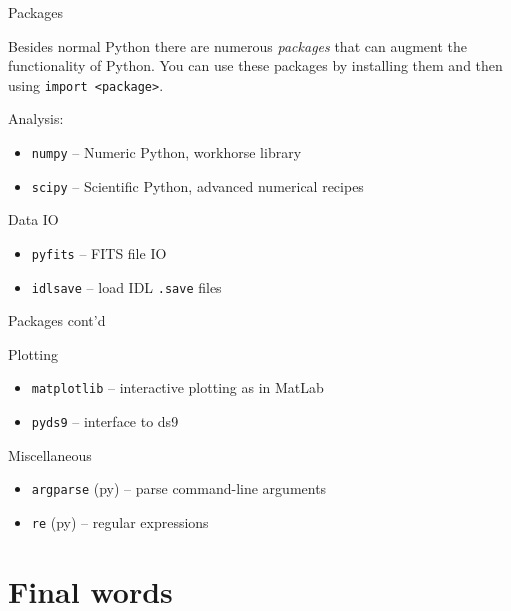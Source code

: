 \documentclass[xetex,10pt]{beamer}
\def\pythoni{\lstinline[language=pythontim]}
\def\spacer{\vspace*{1em}}
\begin{document}
\begin{frame}[fragile]{Packages}

Besides normal Python there are numerous \emph{packages} that can augment the functionality of Python. You can use these packages by installing them and then using \pythoni{import <package>}.

	\spacer

Analysis:
\begin{itemize}
\item \texttt{numpy} -- Numeric Python, workhorse library
\item \texttt{scipy} -- Scientific Python, advanced numerical recipes
\end{itemize}

	\spacer
	\pause

Data IO
\begin{itemize}
\item \texttt{pyfits} -- FITS file IO
\item \texttt{idlsave} -- load IDL \texttt{.save} files
\end{itemize}

	\spacer
\end{frame}

\begin{frame}[fragile]{Packages cont'd}

Plotting
\begin{itemize}
\item \texttt{matplotlib} -- interactive plotting as in MatLab
\item \texttt{pyds9} -- interface to ds9
\end{itemize}

	\spacer
	\pause

Miscellaneous
\begin{itemize}
\item \texttt{argparse} (py) -- parse command-line arguments
\item \texttt{re} (py) -- regular expressions
\end{itemize}

\end{frame}

\section{Final words}
\end{document}

